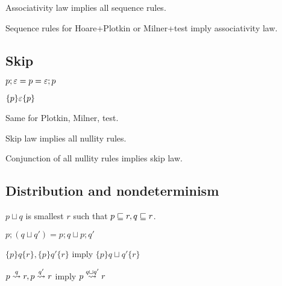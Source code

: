 \documentclass{article}
\begin{document}
\begin{theorem}
Associativity law implies all sequence rules.
\end{theorem}

\begin{theorem}
Sequence rules for Hoare+Plotkin or Milner+test imply associativity law.
\end{theorem}


\subsection*{Skip}

\begin{law}[Skip]
$p;\varepsilon = p = \varepsilon;p$
\end{law}

\begin{rul}
$\{p\}\varepsilon\{p\}$
\end{rul}

Same for Plotkin, Milner, test.

\begin{theorem}
Skip law implies all nullity rules.
\end{theorem}

\begin{theorem}
Conjunction of all nullity rules implies skip law.
\end{theorem}


\subsection*{Distribution and nondeterminism}

\begin{definition}[$\sqcup$]
$p \sqcup q$ is smallest $r$ such that $p \sqsubseteq r, q \sqsubseteq r$.
\end{definition}

\begin{law}
$p; (q \sqcup q') = p;q \sqcup p;q'$
\end{law}

\begin{rul}
$\{p\}q\{r\}, \{p\}q'\{r\}$ imply $\{p\}q\sqcup q'\{r\}$
\end{rul}

\begin{rul}
$p \stackrel{q}{\leadsto} r, p \stackrel{q'}{\leadsto} r$ imply $p \stackrel{q\sqcup q'}{\leadsto} r$
\end{rul}
\end{document}
